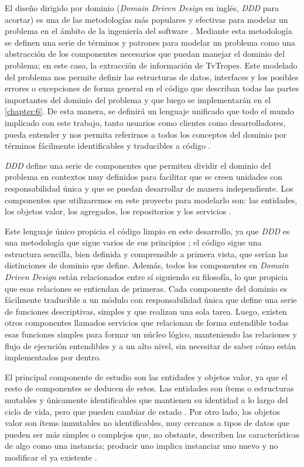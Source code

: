 El diseño dirigido por dominio (\textit{Domain Driven Design} en inglés,
\textit{DDD} para acortar) es una de las metodologías más populares y efectivas
para modelar un problema en el ámbito de la ingeniería del software
\cite{ddd_golang}. Mediante esta metodología se definen una serie de términos y
patrones para modelar un problema como una abstracción de los componentes
necesarios que puedan manejar el dominio del problema; en este caso, la
extracción de información de TvTropes. Este modelado del problema nos permite
definir las estructuras de datos, interfaces y los posibles errores o
excepciones de forma general en el código que describan todas las partes
importantes del dominio del problema y que luego se implementarán en el
\autoref{chapter:6}. De esta manera, se definirá un lenguaje unificado que todo
el mundo implicado con este trabajo, tanto usuarios como clientes como
desarrolladores, pueda entender y nos permita referirnos a todos los conceptos
del dominio por términos fácilmente identificables y traducibles a código
\cite{ddd_golang}.

\textit{DDD} define una serie de componentes que permiten dividir el dominio del
problema en contextos muy definidos para facilitar que se creen unidades con
responsabilidad única y que se puedan desarrollar de manera independiente. Los
componentes que utilizaremos en este proyecto para modelarlo son: las entidades,
los objetos valor, los agregados, los repositorios y los servicios
\cite{ddd_golang}. 

Este lenguaje único propicia el código limpio en este desarrollo, ya que
\textit{DDD} es una metodología que sigue varios de sus principios
\cite{clean_code_rules}; el código sigue una estructura sencilla, bien definida
y comprensible a primera vista, que serían las distinciones de dominio que
define. Además, todos los componentes en \textit{Domain Driven Design} están
relacionados entre sí siguiendo su filosofía, lo que propicia que esas
relaciones se entiendan de primeras. Cada componente del dominio es fácilmente
traducible a un módulo con responsabilidad única que define una serie de
funciones descriptivas, simples y que realizan una sola tarea. Luego, existen
otros componentes llamados servicios que relacionan de forma entendible todas
esas funciones simples para formar un núcleo lógico, manteniendo las relaciones
y flujo de ejecución entendibles y a un alto nivel, sin necesitar de saber cómo
están implementados por dentro.

El principal componente de estudio son las entidades y objetos valor, ya que el
resto de componentes se deducen de estos. Las entidades son ítems o estructuras
mutables y únicamente identificables que mantienen su identidad a lo largo del
ciclo de vida, pero que pueden cambiar de estado \cite{jannik_ddd}. Por otro
lado, los objetos valor son ítems inmutables no identificables, muy cercanos a
tipos de datos que pueden ser más simples o complejos que, no obstante,
describen las características de algo como una instancia; producir uno implica
instanciar uno nuevo y no modificar el ya existente \cite{jannik_ddd}.

